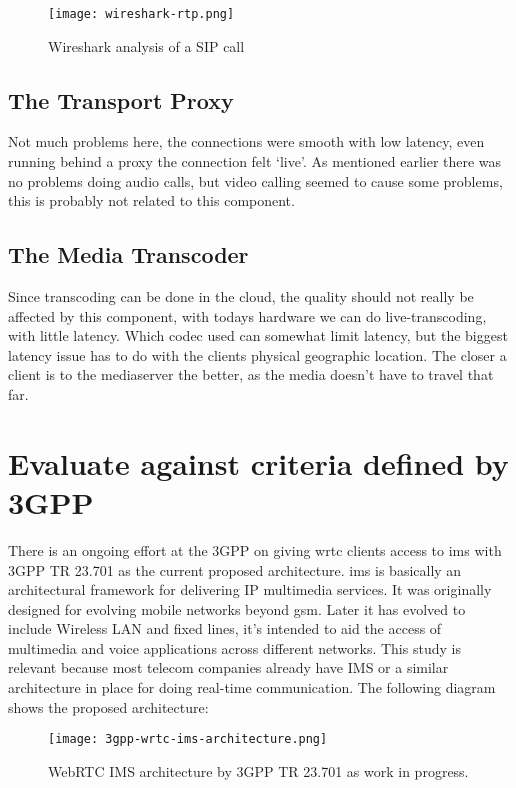 \newpage
\begin{figure}[here]
\centerline{\texttt{[image: wireshark-rtp.png]}}
\caption{Wireshark analysis of a SIP call}
\label{fig:wireshark-sip-call}
\end{figure}

\subsection{The Transport Proxy}
Not much problems here, the connections were smooth with low latency, even running behind a proxy the connection felt `live'. As mentioned earlier there was no problems doing audio calls, but video calling seemed to cause some problems, this is probably not related to this component.


\subsection{The Media Transcoder}
Since transcoding can be done in the cloud, the quality should not really be affected by this component, with todays hardware we can do live-transcoding, with little latency. Which codec used can somewhat limit latency, but the biggest latency issue has to do with the clients physical geographic location. The closer a client is to the mediaserver the better, as the media doesn't have to travel that far. 


\section{Evaluate against criteria defined by 3GPP}
There is an ongoing effort at the 3GPP on giving \gls{wrtc} clients access to \gls{ims} with 3GPP TR 23.701\cite{3gpp-wrtc-access-ims} as the current proposed architecture. \gls{ims} is basically an architectural framework for delivering IP multimedia services. It was originally designed for evolving mobile networks beyond \gls{gsm}. Later it has evolved to include Wireless LAN and fixed lines, it's intended to aid the access of multimedia and voice applications across different networks. This study is relevant because most telecom companies already have IMS or a similar architecture in place for doing real-time communication. The following diagram shows the proposed architecture:

\begin{figure}[here]
\centerline{\texttt{[image: 3gpp-wrtc-ims-architecture.png]}}
\caption{WebRTC IMS architecture by 3GPP TR 23.701 as work in progress.}
\label{fig:wrtc-ims-architecture}
\end{figure}

